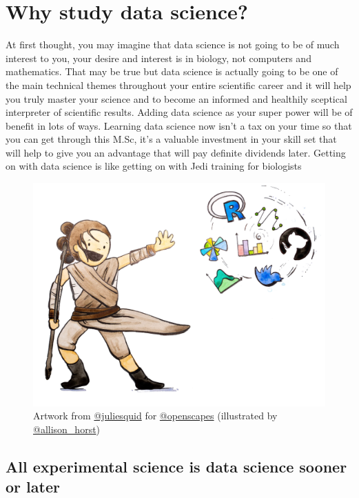 \documentclass[
]{book}
\begin{document}
\hypertarget{intro}{%
\chapter{Why study data science?}\label{intro}}

At first thought, you may imagine that data science is not going to be of much interest to you, your desire and interest is in biology, not computers and mathematics. That may be true but data science is actually going to be one of the main technical themes throughout your entire scientific career and it will help you truly master your science and to become an informed and healthily sceptical interpreter of scientific results. Adding data science as your super power will be of benefit in lots of ways. Learning data science now isn't a tax on your time so that you can get through this M.Sc, it's a valuable investment in your skill set that will help to give you an advantage that will pay definite dividends later. Getting on with data science is like getting on with Jedi training for biologists

\begin{figure}
\centering
\includegraphics{starwars-rey-rstats.png}
\caption{\label{fig:unnamed-chunk-4}Artwork from \href{https://twitter.com/juliesquid}{@juliesquid} for \href{https://twitter.com/openscapes}{@openscapes} (illustrated by \href{https://twitter.com/allison_horst}{@allison\_horst})}
\end{figure}

\hypertarget{all-experimental-science-is-data-science-sooner-or-later}{%
\section{All experimental science is data science sooner or later}\label{all-experimental-science-is-data-science-sooner-or-later}}
\end{document}
